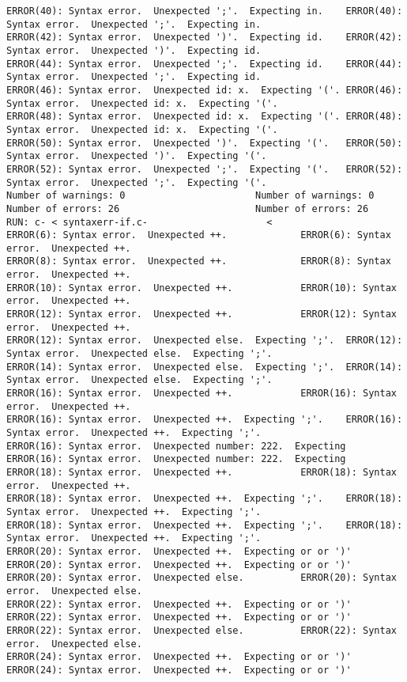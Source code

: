 \documentclass[12pt]{book}
\begin{document}
\begin{lstlisting}
ERROR(40): Syntax error.  Unexpected ';'.  Expecting in.	ERROR(40): Syntax error.  Unexpected ';'.  Expecting in.
ERROR(42): Syntax error.  Unexpected ')'.  Expecting id.	ERROR(42): Syntax error.  Unexpected ')'.  Expecting id.
ERROR(44): Syntax error.  Unexpected ';'.  Expecting id.	ERROR(44): Syntax error.  Unexpected ';'.  Expecting id.
ERROR(46): Syntax error.  Unexpected id: x.  Expecting '('.	ERROR(46): Syntax error.  Unexpected id: x.  Expecting '('.
ERROR(48): Syntax error.  Unexpected id: x.  Expecting '('.	ERROR(48): Syntax error.  Unexpected id: x.  Expecting '('.
ERROR(50): Syntax error.  Unexpected ')'.  Expecting '('.	ERROR(50): Syntax error.  Unexpected ')'.  Expecting '('.
ERROR(52): Syntax error.  Unexpected ';'.  Expecting '('.	ERROR(52): Syntax error.  Unexpected ';'.  Expecting '('.
Number of warnings: 0						Number of warnings: 0
Number of errors: 26						Number of errors: 26
RUN: c- < syntaxerr-if.c-				      <
ERROR(6): Syntax error.  Unexpected ++.				ERROR(6): Syntax error.  Unexpected ++.
ERROR(8): Syntax error.  Unexpected ++.				ERROR(8): Syntax error.  Unexpected ++.
ERROR(10): Syntax error.  Unexpected ++.			ERROR(10): Syntax error.  Unexpected ++.
ERROR(12): Syntax error.  Unexpected ++.			ERROR(12): Syntax error.  Unexpected ++.
ERROR(12): Syntax error.  Unexpected else.  Expecting ';'.	ERROR(12): Syntax error.  Unexpected else.  Expecting ';'.
ERROR(14): Syntax error.  Unexpected else.  Expecting ';'.	ERROR(14): Syntax error.  Unexpected else.  Expecting ';'.
ERROR(16): Syntax error.  Unexpected ++.			ERROR(16): Syntax error.  Unexpected ++.
ERROR(16): Syntax error.  Unexpected ++.  Expecting ';'.	ERROR(16): Syntax error.  Unexpected ++.  Expecting ';'.
ERROR(16): Syntax error.  Unexpected number: 222.  Expecting 	ERROR(16): Syntax error.  Unexpected number: 222.  Expecting 
ERROR(18): Syntax error.  Unexpected ++.			ERROR(18): Syntax error.  Unexpected ++.
ERROR(18): Syntax error.  Unexpected ++.  Expecting ';'.	ERROR(18): Syntax error.  Unexpected ++.  Expecting ';'.
ERROR(18): Syntax error.  Unexpected ++.  Expecting ';'.	ERROR(18): Syntax error.  Unexpected ++.  Expecting ';'.
ERROR(20): Syntax error.  Unexpected ++.  Expecting or or ')'	ERROR(20): Syntax error.  Unexpected ++.  Expecting or or ')'
ERROR(20): Syntax error.  Unexpected else.			ERROR(20): Syntax error.  Unexpected else.
ERROR(22): Syntax error.  Unexpected ++.  Expecting or or ')'	ERROR(22): Syntax error.  Unexpected ++.  Expecting or or ')'
ERROR(22): Syntax error.  Unexpected else.			ERROR(22): Syntax error.  Unexpected else.
ERROR(24): Syntax error.  Unexpected ++.  Expecting or or ')'	ERROR(24): Syntax error.  Unexpected ++.  Expecting or or ')'

\end{lstlisting}
\end{document}
